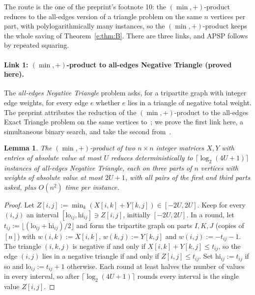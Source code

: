 \documentclass[11pt]{article}
\newtheorem{lemma}[theorem]{Lemma}
\theoremstyle{definition}
\theoremstyle{remark}
\begin{document}
The route is the one of the preprint's footnote 10: the $(\min,+)$-product reduces to the all-edges version of a triangle problem on the same $n$ vertices per part, with polylogarithmically many instances, so the $(\min,+)$-product keeps the whole saving of Theorem~\ref{e:thm:B}. There are three links, and APSP follows by repeated squaring.

\paragraph{Link 1: $(\min,+)$-product to all-edges Negative Triangle (proved here).} The \emph{all-edges Negative Triangle} problem asks, for a tripartite graph with integer edge weights, for every edge $e$ whether $e$ lies in a triangle of negative total weight. The preprint attributes the reduction of the $(\min,+)$-product to the all-edges Exact Triangle problem on the same vertices to~\cite{VW10,VW18,VW13}; we prove the first link here, a simultaneous binary search, and take the second from~\cite{CVX23}.

\begin{lemma}\label{e:lem:binsearch}
The $(\min,+)$-product of two $n\times n$ integer matrices $X,Y$ with entries of absolute value at most $U$ reduces deterministically to $\lceil\log_2(4U+1)\rceil$ instances of all-edges Negative Triangle, each on three parts of $n$ vertices with weights of absolute value at most $2U+1$, with all pairs of the first and third parts asked, plus $O(n^2)$ time per instance.
\end{lemma}
\begin{proof}
Let $Z[i,j]:=\min_k(X[i,k]+Y[k,j])\in[-2U,2U]$. Keep for every $(i,j)$ an interval $[\mathrm{lo}_{ij},\mathrm{hi}_{ij}]\ni Z[i,j]$, initially $[-2U,2U]$. In a round, let $t_{ij}:=\lfloor(\mathrm{lo}_{ij}+\mathrm{hi}_{ij})/2\rfloor$ and form the tripartite graph on parts $I,K,J$ (copies of $[n]$) with $w(i,k):=X[i,k]$, $w(k,j):=Y[k,j]$ and $w(i,j):=-t_{ij}-1$. The triangle $(i,k,j)$ is negative if and only if $X[i,k]+Y[k,j]\le t_{ij}$, so the edge $(i,j)$ lies in a negative triangle if and only if $Z[i,j]\le t_{ij}$. Set $\mathrm{hi}_{ij}:=t_{ij}$ if so and $\mathrm{lo}_{ij}:=t_{ij}+1$ otherwise. Each round at least halves the number of values in every interval, so after $\lceil\log_2(4U+1)\rceil$ rounds every interval is the single value $Z[i,j]$.
\end{proof}
\end{document}
